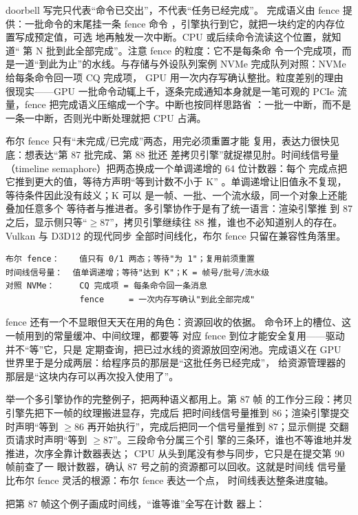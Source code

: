 doorbell 写完只代表“命令已交出”，不代表“任务已经完成”。
完成语义由 fence 提供：一批命令的末尾挂一条 fence 命令
，引擎执行到它，就把一块约定的内存位置写成预定值，可选
地再触发一次中断。CPU 或后续命令流读这个位置，就知道“
第 N 批到此全部完成”。注意 fence 的粒度：它不是每条命
令一个完成项，而是一道“到此为止”的水线。与存储与外设队列案例
NVMe 完成队列对照：NVMe 给每条命令回一项 CQ 完成项，
GPU 用一次内存写确认整批。粒度差别的理由很现实——GPU
一批命令动辄上千，逐条完成通知本身就是一笔可观的 PCIe
流量，fence 把完成语义压缩成一个字。中断也按同样思路省
：一批一中断，而不是一条一中断，否则光中断处理就把 CPU
占满。

布尔 fence 只有“未完成/已完成”两态，用完必须重置才能
复用，表达力很快见底：想表达“第 87 批完成、第 88 批还
差拷贝引擎”就捉襟见肘。时间线信号量（timeline
semaphore）把两态换成一个单调递增的 64 位计数器：每个
完成点把它推到更大的值，等待方声明“等到计数不小于 K”
。单调递增让旧值永不复现，等待条件因此没有歧义；K 可以
是一帧、一批、一个流水级，同一个对象上还能叠加任意多个
等待者与推进者。多引擎协作于是有了统一语言：渲染引擎推
到 87 之后，显示侧只等“$\geq87$”，拷贝引擎继续往 88
推，谁也不必知道别人的存在。Vulkan 与 D3D12 的现代同步
全部时间线化，布尔 fence 只留在兼容性角落里。

\begin{lstlisting}
布尔 fence：    值只有 0/1 两态；等待"为 1"；复用前须重置
时间线信号量：  值单调递增；等待"达到 K"；K = 帧号/批号/流水级
对照 NVMe：     CQ 完成项 = 每条命令回一条消息
               fence     = 一次内存写确认"到此全部完成"
\end{lstlisting}

fence 还有一个不显眼但天天在用的角色：资源回收的依据。
命令环上的槽位、这一帧用到的常量缓冲、中间纹理，都要等
对应 fence 到位才能安全复用——驱动并不“等”它，只是
定期查询，把已过水线的资源放回空闲池。完成语义在 GPU
世界里于是分成两层：给程序员的那层是“这批任务已经完成”，
给资源管理器的那层是“这块内存可以再次投入使用了”。

举一个多引擎协作的完整例子，把两种语义都用上。第 87 帧
的工作分三段：拷贝引擎先把下一帧的纹理搬进显存，完成后
把时间线信号量推到 86；渲染引擎提交时声明“等到
$\geq86$ 再开始执行”，完成后把同一个信号量推到 87；显示侧提
交翻页请求时声明“等到 $\geq87$”。三段命令分属三个引
擎的三条环，谁也不等谁地并发推进，次序全靠计数器表达；
CPU 从头到尾没有参与同步，它只是在提交第 90 帧前查了一
眼计数器，确认 87 号之前的资源都可以回收。这就是时间线
信号量比布尔 fence 灵活的根源：布尔 fence 表达一个点，
时间线表达整条进度轴。

把第 87 帧这个例子画成时间线，“谁等谁”全写在计数
器上：

